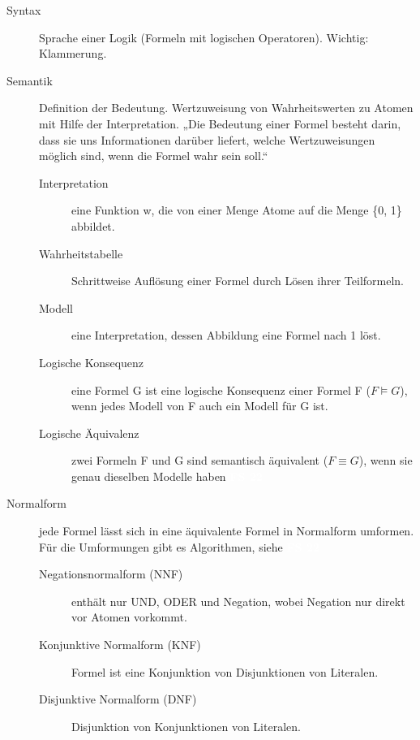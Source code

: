 \documentclass[a4paper,10pt]{article}
\newcommand{\vl}[1]{\colorbox{vl}{\textcolor{white}{\small\textbf{#1}}}}
\begin{document}
\begin{description}
            \item[Syntax] Sprache einer Logik (Formeln mit logischen Operatoren). Wichtig: Klammerung.
            \item[Semantik] Definition der Bedeutung. Wertzuweisung von Wahrheitswerten zu Atomen mit Hilfe der Interpretation.
                „Die Bedeutung einer Formel besteht darin, dass sie uns Informationen darüber liefert, welche Wertzuweisungen möglich sind, wenn die Formel wahr sein soll.“
                \begin{description}
                    \item[Interpretation] eine Funktion w, die von einer Menge Atome auf die Menge \{0, 1\} abbildet.
                    \item[Wahrheitstabelle] Schrittweise Auflösung einer Formel durch Lösen ihrer Teilformeln.
                    \item[Modell] eine Interpretation, dessen Abbildung eine Formel nach 1 löst.
                    \item[Logische Konsequenz] eine Formel G ist eine logische Konsequenz einer Formel F ($F \models G$), wenn jedes Modell von F auch ein Modell für G ist.
                    \item[Logische Äquivalenz] zwei Formeln F und G sind semantisch äquivalent ($F \equiv G$), wenn sie genau dieselben Modelle haben \vl{FS 22}
                \end{description}

            \item[Normalform] jede Formel lässt sich in eine äquivalente Formel in Normalform umformen. \\ Für die Umformungen gibt es Algorithmen, siehe \vl{FS 22}
                \begin{description}
                    \item[Negationsnormalform (NNF)] enthält nur UND, ODER und Negation, wobei Negation nur direkt vor Atomen vorkommt.
                    \item[Konjunktive Normalform (KNF)] Formel ist eine Konjunktion von Disjunktionen von Literalen.
                    \item[Disjunktive Normalform (DNF)] Disjunktion von Konjunktionen von Literalen.
                \end{description}


        \end{description}
\end{document}
